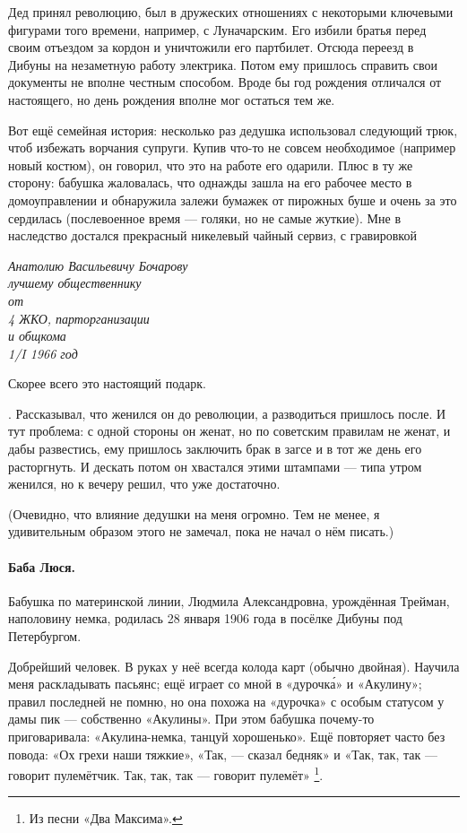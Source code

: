 \documentclass{book}
\begin{document}
Дед принял революцию, был в дружеских отношениях с некоторыми ключевыми фигурами того времени, например, с Луначарским.
Его избили братья перед своим отъездом за кордон и уничтожили его партбилет.
Отсюда переезд в Дибуны на незаметную работу электрика.
Потом ему пришлось справить свои документы не вполне честным способом.
Вроде бы год рождения отличался от настоящего, но день рождения вполне мог остаться тем же.

Вот ещё семейная история:
несколько раз дедушка использовал следующий трюк, чтоб избежать ворчания супруги.
Купив что-то не совсем необходимое (например новый костюм), он говорил, что это на работе его одарили.
Плюс в ту же сторону: бабушка жаловалась, что однажды зашла на его рабочее место в домоуправлении и обнаружила залежи бумажек от пирожных буше и очень за это сердилась (послевоенное время --- голяки, но не самые жуткие).
Мне в наследство достался прекрасный никелевый чайный сервиз, с гравировкой
\begin{center}
\textit{
Анатолию Васильевичу Бочарову\\
лучшему общественнику\\
от\\
4 ЖКО, парторганизации\\
и общкома\\
1/I 1966 год}
\end{center}
Скорее всего это настоящий подарк.

.
Рассказывал, что женился он до революции, а разводиться пришлось после.
И тут проблема: с одной стороны он женат, но по советским правилам не женат,
и дабы развестись, ему пришлось заключить брак в загсе и в тот же день его расторгнуть.
И дескать потом он хвастался этими штампами ---
типа утром женился, но к вечеру решил, что уже достаточно.

(Очевидно, что влияние дедушки на меня огромно.
Тем не менее, я удивительным образом этого не замечал, пока не начал о нём писать.)

\paragraph{Баба Люся.}
Бабушка по материнской линии, Людмила Александровна, урождённая Трейман, наполовину немка, родилась 28 января 1906 года в посёлке Дибуны под Петербургом.

Добрейший человек.
В руках у неё всегда колода карт (обычно двойная).
Научила меня раскладывать пасьянс;  ещё играет со мной в «дурочк\'{а}» и
«Акулину»;
правил последней не помню, но она похожа на «дурочка» с особым статусом у дамы пик --- собственно «Акулины».
При этом бабушка почему-то приговаривала: «Акулина-немка, танцуй хорошенько».
Ещё повторяет часто без повода: «Ох грехи наши тяжкие»,
«Так, --- сказал бедняк»
и «Так, так, так --- говорит пулемётчик. Так, так, так --- говорит пулемёт»%
\footnote{Из песни «Два Максима».}.
\end{document}
